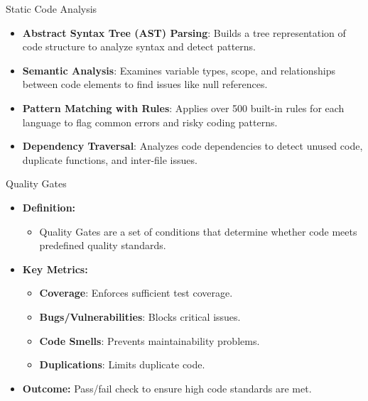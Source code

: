 \documentclass{beamer}
\begin{document}
\begin{frame}{Static Code Analysis}
  \begin{itemize}
    \item \textbf{Abstract Syntax Tree (AST) Parsing}: Builds a tree representation of code structure to analyze syntax and detect patterns.
    \item \textbf{Semantic Analysis}: Examines variable types, scope, and relationships between code elements to find issues like null references.
    \item \textbf{Pattern Matching with Rules}: Applies over 500 built-in rules for each language to flag common errors and risky coding patterns.
    \item \textbf{Dependency Traversal}: Analyzes code dependencies to detect unused code, duplicate functions, and inter-file issues.
\end{itemize}
\end{frame}

\begin{frame}{Quality Gates}
  \begin{itemize}
    \item \textbf{Definition:}
    \begin{itemize}
      \item Quality Gates are a set of conditions that determine whether code meets predefined quality standards.
    \end{itemize}

    \vspace*{1em}

    \item \textbf{Key Metrics:}
    \begin{itemize}
        \item \textbf{Coverage}: Enforces sufficient test coverage.
        \item \textbf{Bugs/Vulnerabilities}: Blocks critical issues.
        \item \textbf{Code Smells}: Prevents maintainability problems.
        \item \textbf{Duplications}: Limits duplicate code.
    \end{itemize}
    
    \vspace*{1em}

    \item \textbf{Outcome:}
    Pass/fail check to ensure high code standards are met.
  \end{itemize}
\end{frame}
\end{document}
